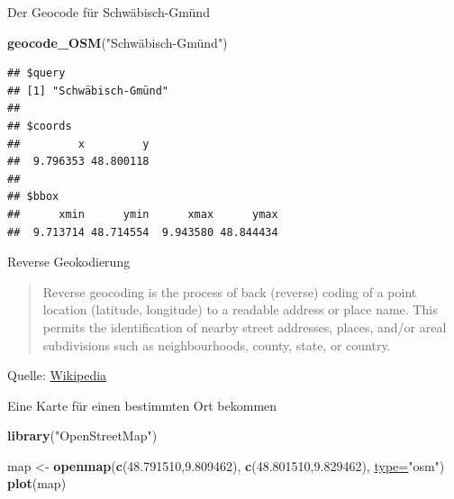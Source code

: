 \documentclass[ignorenonframetext,]{beamer}
\newenvironment{Shaded}{\begin{snugshade}}{\end{snugshade}}
\newcommand{\DataTypeTok}[1]{\textcolor[rgb]{0.74,0.68,0.62}{\underline{#1}}}
\newcommand{\FloatTok}[1]{\textcolor[rgb]{0.27,0.67,0.26}{#1}}
\newcommand{\KeywordTok}[1]{\textcolor[rgb]{0.26,0.66,0.93}{\textbf{#1}}}
\newcommand{\NormalTok}[1]{\textcolor[rgb]{0.74,0.68,0.62}{#1}}
\newcommand{\StringTok}[1]{\textcolor[rgb]{0.02,0.61,0.04}{#1}}
\begin{document}
\begin{frame}[fragile]{Der Geocode für Schwäbisch-Gmünd}
\protect\hypertarget{der-geocode-fur-schwabisch-gmund}{}

\begin{Shaded}
\begin{Highlighting}[]
\KeywordTok{geocode_OSM}\NormalTok{(}\StringTok{"Schwäbisch-Gmünd")}
\end{Highlighting}
\end{Shaded}

\begin{verbatim}
## $query
## [1] "Schwäbisch-Gmünd"
## 
## $coords
##         x         y 
##  9.796353 48.800118 
## 
## $bbox
##      xmin      ymin      xmax      ymax 
##  9.713714 48.714554  9.943580 48.844434
\end{verbatim}

\end{frame}

\begin{frame}{Reverse Geokodierung}
\protect\hypertarget{reverse-geokodierung}{}

\begin{quote}
Reverse geocoding is the process of back (reverse) coding of a point
location (latitude, longitude) to a readable address or place name. This
permits the identification of nearby street addresses, places, and/or
areal subdivisions such as neighbourhoods, county, state, or country.
\end{quote}

Quelle:
\href{https://en.wikipedia.org/wiki/Reverse_geocoding}{Wikipedia}

\end{frame}

\begin{frame}[fragile]{Eine Karte für einen bestimmten Ort bekommen}
\protect\hypertarget{eine-karte-fur-einen-bestimmten-ort-bekommen}{}

\begin{Shaded}
\begin{Highlighting}[]
\KeywordTok{library}\NormalTok{(}\StringTok{"OpenStreetMap"}\NormalTok{)}

\NormalTok{map <-}\StringTok{ }\KeywordTok{openmap}\NormalTok{(}\KeywordTok{c}\NormalTok{(}\FloatTok{48.791510}\NormalTok{,}\FloatTok{9.809462}\NormalTok{),}
               \KeywordTok{c}\NormalTok{(}\FloatTok{48.801510}\NormalTok{,}\FloatTok{9.829462}\NormalTok{),}
               \DataTypeTok{type=}\StringTok{"osm"}\NormalTok{)}
\KeywordTok{plot}\NormalTok{(map)}
\end{Highlighting}
\end{Shaded}

\end{frame}
\end{document}

